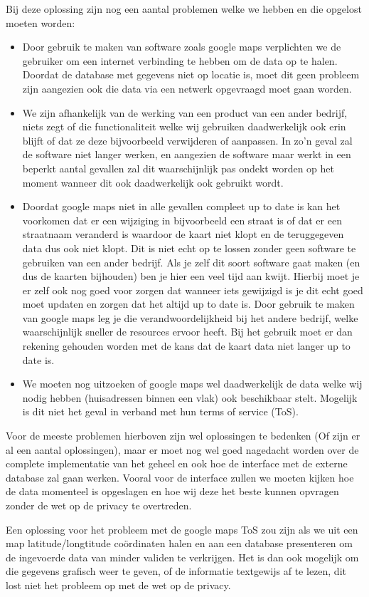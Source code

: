 Bij deze oplossing zijn nog een aantal problemen welke we hebben en die opgelost moeten worden:
\begin{itemize}
        \item Door gebruik te maken van software zoals google maps verplichten we de gebruiker om een internet verbinding te hebben om de data op te halen. Doordat de database met gegevens niet op locatie is, moet dit geen probleem zijn aangezien ook die data via een netwerk opgevraagd moet gaan worden.
        \item We zijn afhankelijk van de werking van een product van een ander bedrijf, niets zegt of die functionaliteit welke wij  gebruiken daadwerkelijk ook erin blijft of dat ze deze bijvoorbeeld verwijderen of aanpassen. In zo'n geval zal de software niet langer werken, en aangezien de software maar werkt in een beperkt aantal gevallen zal dit waarschijnlijk pas ondekt worden op het moment wanneer dit ook daadwerkelijk ook gebruikt wordt. 
        \item Doordat google maps niet in alle gevallen compleet up to date is kan het voorkomen dat er een wijziging in bijvoorbeeld een straat is of dat er een straatnaam veranderd is waardoor de kaart niet klopt en de teruggegeven data dus ook niet klopt. Dit is niet echt op te lossen zonder geen software te gebruiken van een ander bedrijf. Als je zelf dit soort software gaat maken (en dus de kaarten bijhouden) ben je hier een veel tijd aan kwijt. Hierbij moet je er zelf ook nog goed voor zorgen dat wanneer iets gewijzigd is je dit echt goed moet updaten en zorgen dat het altijd up to date is. Door gebruik te maken van google maps leg je die verandwoordelijkheid bij het andere bedrijf, welke waarschijnlijk sneller de resources ervoor heeft. Bij het gebruik moet er dan rekening gehouden worden met de kans dat de kaart data niet langer up to date is. 
        \item We moeten nog uitzoeken of google maps wel daadwerkelijk de data welke wij nodig hebben (huisadressen binnen een vlak) ook beschikbaar stelt. Mogelijk is dit niet het geval in verband met hun terms of service (ToS).
\end{itemize}
Voor de meeste problemen hierboven zijn wel oplossingen te bedenken (Of zijn er al een aantal oplossingen), maar er moet nog wel goed nagedacht worden over de complete implementatie van het geheel en ook hoe de interface met de externe database zal gaan werken. Vooral voor de interface zullen we moeten kijken hoe de data momenteel is opgeslagen en hoe wij deze het beste kunnen opvragen zonder de wet op de privacy te overtreden.

Een oplossing voor het probleem met de google maps ToS zou zijn als we uit een map latitude/longtitude co\"{o}rdinaten halen en aan een database presenteren om de ingevoerde data van minder validen te verkrijgen. Het is dan ook mogelijk om die gegevens grafisch weer te geven, of de informatie textgewijs af te lezen, dit lost niet het probleem op met de wet op de privacy.
